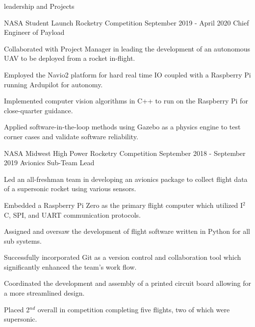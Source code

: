 \documentclass{resume} %
\begin{document}
    \begin{rSection} {leadership and Projects}

        \begin{rSubsection} {NASA Student Launch Rocketry Competition} {September 2019 - April 2020} {Chief Engineer of Payload}

            \item Collaborated with Project Manager in leading the development of an autonomous UAV to be deployed from a rocket in-flight.
            \item Employed the Navio2 platform for hard real time IO coupled with a Raspberry Pi running Ardupilot for autonomy.
            \item Implemented computer vision algorithms in C++ to run on the Raspberry Pi for close-quarter guidance.
            \item Applied software-in-the-loop methods using Gazebo as a physics engine to test corner cases and validate software reliability.


        \end{rSubsection}



        \begin{rSubsection} {NASA Midwest High Power Rocketry Competition} {September 2018 - September 2019} {Avionics Sub-Team Lead}

            \item Led an all-freshman team in developing an avionics package to collect flight data of a supersonic rocket using various sensors.
            \item Embedded a Raspberry Pi Zero as the primary flight computer which utilized I$^2$C, SPI, and UART communication protocols.
            \item Assigned and oversaw the development of flight software written in Python for all sub systems.
            \item Successfully incorporated Git as a version control and collaboration tool which significantly enhanced the team's work flow.
            \item Coordinated the development and assembly of a printed circuit board allowing for a more streamlined design.
            \item Placed 2$^{nd}$ overall in competition completing five flights, two of which were supersonic.

        \end{rSubsection}


\end{rSection}
\end{document}
